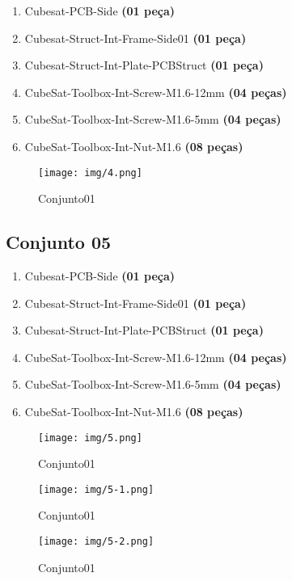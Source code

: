 \begin{enumerate}[label*=\ref*{subs:c04}\arabic*]
	\item Cubesat-PCB-Side \textbf{(01 peça)}
	\item Cubesat-Struct-Int-Frame-Side01 \textbf{(01 peça)}
	\item Cubesat-Struct-Int-Plate-PCBStruct \textbf{(01 peça)}
	\item CubeSat-Toolbox-Int-Screw-M1.6-12mm \textbf{(04 peças)}
	\item CubeSat-Toolbox-Int-Screw-M1.6-5mm \textbf{(04 peças)}
	\item CubeSat-Toolbox-Int-Nut-M1.6 \textbf{(08 peças)}
\end{enumerate}

\begin{figure}[ht!]
	\centering
	\texttt{[image: img/4.png]}
	\caption{Conjunto01}
	\label{4}
\end{figure}



\newpage
\subsection{Conjunto 05}\label{subs:c05}

\begin{enumerate}[label*=\ref*{subs:c05}\arabic*]
	\item Cubesat-PCB-Side \textbf{(01 peça)}
	\item Cubesat-Struct-Int-Frame-Side01 \textbf{(01 peça)}
	\item Cubesat-Struct-Int-Plate-PCBStruct \textbf{(01 peça)}
	\item CubeSat-Toolbox-Int-Screw-M1.6-12mm \textbf{(04 peças)}
	\item CubeSat-Toolbox-Int-Screw-M1.6-5mm \textbf{(04 peças)}
	\item CubeSat-Toolbox-Int-Nut-M1.6 \textbf{(08 peças)}
\end{enumerate}

\begin{figure}[ht!]
	\centering
	\texttt{[image: img/5.png]}
	\caption{Conjunto01}
	\label{5}
\end{figure}

\begin{figure}[ht!]
	\centering
	\texttt{[image: img/5-1.png]}
	\caption{Conjunto01}
	\label{5-1}
\end{figure}

\begin{figure}[ht!]
	\centering
	\texttt{[image: img/5-2.png]}
	\caption{Conjunto01}
	\label{5-2}
\end{figure}

